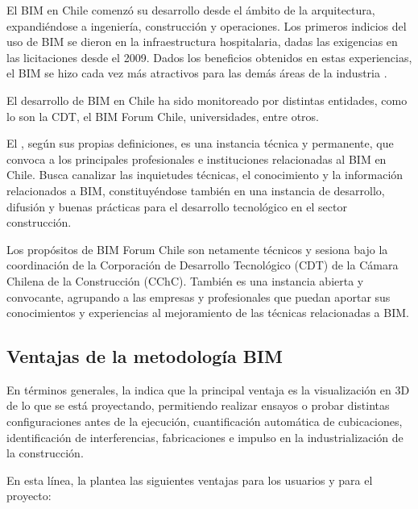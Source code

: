 El BIM en Chile comenzó su desarrollo desde el ámbito de la arquitectura, expandiéndose a ingeniería, construcción y operaciones. Los primeros indicios del uso de BIM se dieron en la infraestructura hospitalaria, dadas las exigencias en las licitaciones desde el 2009. Dados los beneficios obtenidos en estas experiencias, el BIM se hizo cada vez más atractivos para las demás áreas de la industria \cite{trejo2018estudio}.

El desarrollo de BIM en Chile ha sido monitoreado por distintas entidades, como lo son la CDT, el BIM Forum Chile, universidades, entre otros.

El , según sus propias definiciones, es una instancia técnica y permanente, que convoca a los principales profesionales e instituciones relacionadas al BIM en Chile. Busca canalizar las inquietudes técnicas, el conocimiento y la información relacionados a BIM, constituyéndose también en una instancia de desarrollo, difusión y buenas prácticas para el desarrollo tecnológico en el sector construcción.

Los propósitos de BIM Forum Chile son netamente técnicos y sesiona bajo la coordinación de la Corporación de Desarrollo Tecnológico (CDT) de la Cámara Chilena de la Construcción (CChC). También es una instancia abierta y convocante, agrupando a las empresas y profesionales que puedan aportar sus conocimientos y experiencias al mejoramiento de las técnicas relacionadas a BIM.

\subsection{Ventajas de la metodología BIM}

En términos generales, la  indica que la principal ventaja es la visualización en 3D de lo que se está proyectando, permitiendo realizar ensayos o probar distintas configuraciones antes de la ejecución, cuantificación automática de cubicaciones, identificación de interferencias, fabricaciones e impulso en la industrialización de la construcción.

En esta línea, la  plantea las siguientes ventajas para los usuarios y para el proyecto:

